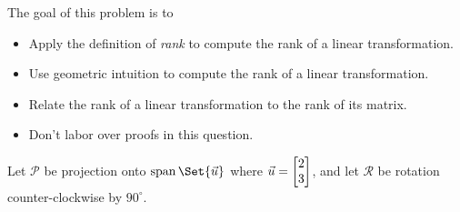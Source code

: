 \documentclass{problemset}
\begin{document}
	\question
	\begin{annotation}
		\begin{goals}

			The goal of this problem is to
			\begin{itemize}
				\item Apply the definition of \emph{rank} to compute the rank of a linear transformation.
				\item Use geometric intuition to compute the rank of a linear transformation.
				\item Relate the rank of a linear transformation to the rank of its matrix.
			\end{itemize}
		\end{goals}

		\begin{notes}
			\begin{itemize}
				\item Don't labor over proofs in this question.
			\end{itemize}
		\end{notes}
	\end{annotation}
	\label{rankOfMatricesAndTransformations}
	Let $\mathcal P$ be projection onto $\Span\Set{\vec u}$ where $\vec u=\mat{2\\3}$,
	and let $\mathcal R$ be rotation counter-clockwise by $90^\circ$.
\end{document}
